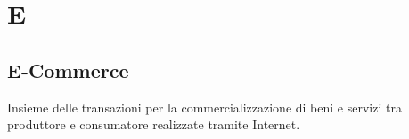 \section*{E}
\markright{}

\subsection*{E-Commerce}
Insieme delle transazioni per la commercializzazione di beni e servizi tra produttore e consumatore realizzate tramite Internet.